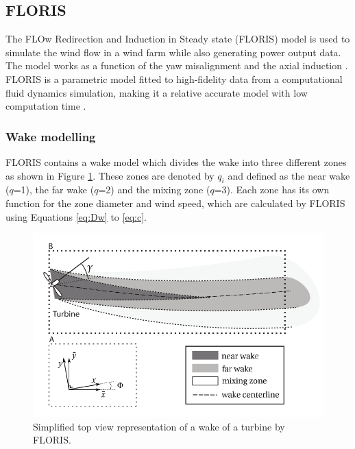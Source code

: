 
\subsection{FLORIS} \label{sec:floris} The FLOw Redirection and Induction in Steady state (FLORIS) model is used to simulate the wind flow in a wind farm while also generating power output data. The model works as a function of the yaw misalignment and the axial induction \cite{Gebraad2016}. FLORIS is a parametric model fitted to high-fidelity data from a computational fluid dynamics simulation, making it a relative accurate model with low computation time \cite{Dijk2016}. 

\subsubsection{Wake modelling}
\label{wakemodel}
FLORIS contains a wake model which divides the wake into three different zones as shown in Figure \ref{fig:wake}. These zones are denoted by $q_i$ and defined as the near wake ($q$=1), the far wake ($q$=2) and the mixing zone ($q$=3). Each zone has its own function for the zone diameter and wind speed, which are calculated by FLORIS using Equations \ref{eq:Dw} to \ref{eq:c}. 


\begin{figure}
  	\includegraphics[width=\linewidth]{./Figures/WakeFLORIS.png}
  	\caption{Simplified top view representation of a wake of a turbine by FLORIS\cite{Gebraad2016}.}
	\label{fig:wake}
\end{figure}

